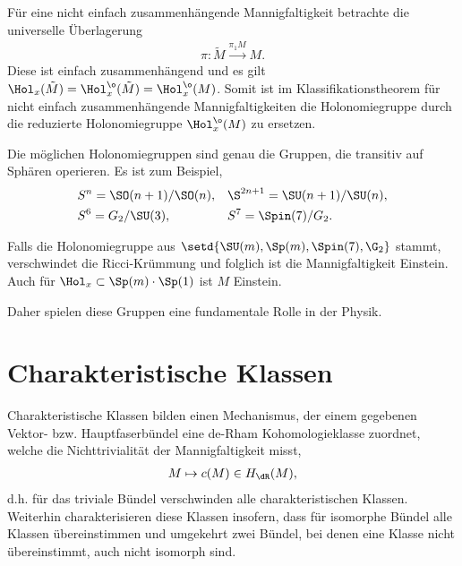 \documentclass[%
	paper=a5,%
	fleqn,%
	DIV=18,%
	BCOR=0mm,
	fontsize=11pt,
	titlepage=false,%
	bibliography=totoc,
	DIV=18,%
	twoside=true,
	pdftitle=Riemannsche Geometrie,
	pdfauthor=Uwe Semmelmann,
	numbers=noendperiod]%
	{scrbook}
\begin{document}
\begin{rem}[Bemerkungen.]
\begin{remenum}
\item
Für eine nicht einfach zusammenhängende Mannigfaltigkeit betrachte die
universelle Überlagerung
\begin{align*}
\pi\colon \tilde M \overset{\pi_1 M}{\longrightarrow} M.
\end{align*}
Diese ist einfach zusammenhängend und es gilt $\Hol_x(\tilde{M})
=\Hol_x^\o(\tilde{M}) = \Hol_x^\o(M)$. Somit ist im Klassifikationstheorem für
nicht einfach zusammenhängende Mannigfaltigkeiten die Holonomiegruppe durch die
reduzierte Holonomiegruppe $\Hol_x^\o(M)$ zu ersetzen.
\item Die möglichen Holonomiegruppen sind genau die Gruppen, die transitiv auf
Sphären operieren. Es ist zum Beispiel,
\begin{align*}
&S^n  =\SO(n+1)/\SO(n),&& \S^{2n+1} = \SU(n+1)/\SU(n),\\
&S^6 = G_2/\SU(3), && S^7 = \Spin(7)/G_2.
\end{align*}
\item Falls die Holonomiegruppe aus $\setd{\SU(m),\Sp(m),\Spin(7),\G_2}$ stammt,
verschwindet die Ricci-Krümmung und folglich ist die Mannigfaltigkeit Einstein.
Auch für $\Hol_x\subset \Sp(m)\cdot \Sp(1)$ ist $M$ Einstein.

Daher spielen diese Gruppen eine fundamentale Rolle in der Physik.\map  
\end{remenum}
\end{rem}

\chapter{Charakteristische Klassen}

Charakteristische Klassen bilden einen Mechanismus, der einem gegebenen Vektor-
bzw. Hauptfaserbündel eine de-Rham Kohomologieklasse zuordnet,
welche die Nichttrivialität der Mannigfaltigkeit misst,
\begin{align*}
M\mapsto c(M)\in H_\dR(M),
\end{align*}
d.h. für das triviale Bündel verschwinden alle charakteristischen Klassen.
Weiterhin charakterisieren diese Klassen insofern, dass für isomorphe Bündel
alle Klassen übereinstimmen und umgekehrt zwei Bündel, bei denen eine Klasse
nicht übereinstimmt, auch nicht isomorph sind.
\end{document}
